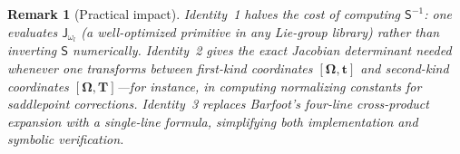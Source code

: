 \documentclass[journal]{IEEEtran}
\newcommand{\bfOmega}{\boldsymbol{\Omega}}
\newtheorem{remark}{Remark}
\begin{document}
\begin{remark}[Practical impact]
Identity~1 halves the cost of computing $\mathsf{S}^{-1}$: 
one evaluates $\mathsf{J}_{\omega_l}$ (a well-optimized primitive 
in any Lie-group library) rather than inverting $\mathsf{S}$ 
numerically. Identity~2 gives the exact Jacobian determinant 
needed whenever one transforms between first-kind coordinates 
$[\bfOmega,\mathbf{t}]$ and second-kind coordinates 
$[\bfOmega,\mathbf{T}]$---for instance, in computing normalizing 
constants for saddlepoint corrections. Identity~3 replaces 
Barfoot's four-line cross-product expansion with a single-line formula, 
simplifying both implementation and symbolic verification.
\end{remark}

\end{document}
